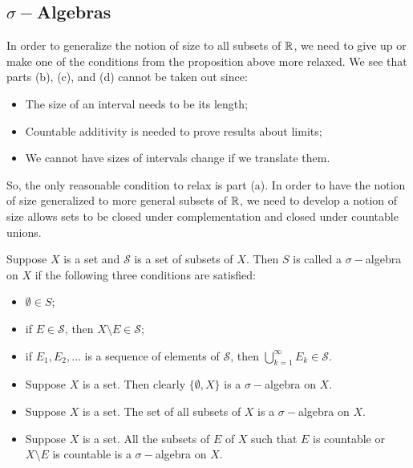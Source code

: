\documentclass[11pt,a4paper]{book}
\begin{document}
\subsection{\( \sigma- \)Algebras}

In order to generalize the notion of size to all subsets of \( \mathbb{R}  \), we need to give up or make one of the conditions from the proposition above more relaxed. We see that parts (b), (c), and (d) cannot be taken out since: 
\begin{itemize}
    \item The size of an interval needs to be its length;
    \item Countable additivity is needed to prove results about limits;
    \item We cannot have sizes of intervals change if we translate them.
\end{itemize}
So, the only reasonable condition to relax is part (a). In order to have the notion of size generalized to more general subsets of \( \mathbb{R}  \), we need to develop a notion of size allows sets to be closed under complementation and closed under countable unions.   

\begin{definition}
    Suppose \( X  \) is a set and \( \mathcal{S}  \) is a set of subsets of \( X  \). Then \( S  \) is called a \( \sigma- \)algebra on \( X  \) if the following three conditions are satisfied:
    \begin{itemize}
        \item \( \emptyset \in S  \);
        \item if \( E \in \mathcal{S}  \), then \( X \setminus E \in \mathcal{S} \);
        \item if \( {E}_{1}, {E}_{2}, \dots  \) is a sequence of elements of \(  \mathcal{S }  \), then \( \bigcup_{ k=1  }^{ \infty  } {E}_{k } \in \mathcal{S}  \).
    \end{itemize}

\end{definition}

\begin{eg}
   \begin{itemize}
       \item Suppose \(  X  \) is a set. Then clearly \( \{ \emptyset, X  \}   \) is a \( \sigma-  \)algebra on \( X  \). 
        \item Suppose \( X  \) is a set. The set of all subsets of \( X  \) is a \( \sigma- \)algebra on \( X  \).
        \item Suppose \( X  \) is a set. All the subsets of \( E  \) of \( X  \) such that  \( E  \) is countable or \( X \setminus E  \) is countable is a \( \sigma- \)algebra on \( X  \). 
   \end{itemize} 
\end{eg}
\end{document}
